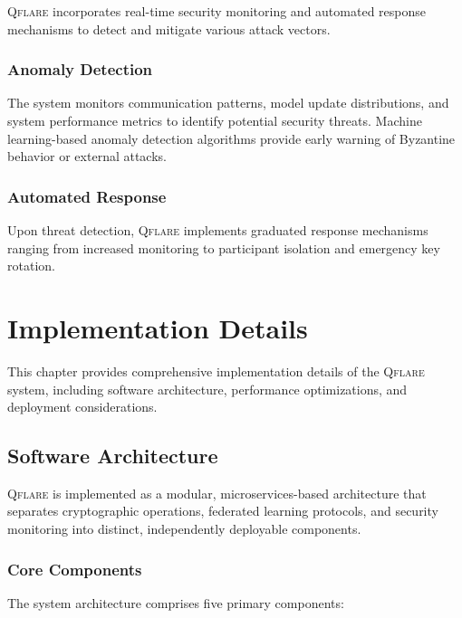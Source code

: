 ﻿\documentclass[12pt,a4paper,twoside]{book}
\newcommand{\qflare}{\textsc{Qflare}}
\begin{document}
\qflare{} incorporates real-time security monitoring and automated response mechanisms to detect and mitigate various attack vectors.

\subsection{Anomaly Detection}
\label{subsec:anomaly-detection}

The system monitors communication patterns, model update distributions, and system performance metrics to identify potential security threats. Machine learning-based anomaly detection algorithms provide early warning of Byzantine behavior or external attacks.

\subsection{Automated Response}
\label{subsec:automated-response}

Upon threat detection, \qflare{} implements graduated response mechanisms ranging from increased monitoring to participant isolation and emergency key rotation.

\chapter{Implementation Details}
\label{ch:implementation}

This chapter provides comprehensive implementation details of the \qflare{} system, including software architecture, performance optimizations, and deployment considerations.

\section{Software Architecture}
\label{sec:software-architecture}

\qflare{} is implemented as a modular, microservices-based architecture that separates cryptographic operations, federated learning protocols, and security monitoring into distinct, independently deployable components.

\subsection{Core Components}
\label{subsec:core-components}

The system architecture comprises five primary components:
\end{document}
